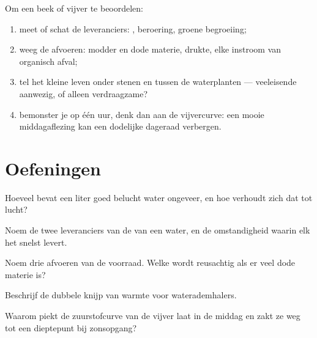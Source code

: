 \begin{method}\label{met:g7:oxygen-in-the-water:judge}
Om een beek of vijver te beoordelen:
\begin{enumerate}
  \item meet of schat de leveranciers: , beroering, groene
        begroeiing;
  \item weeg de afvoeren: modder en dode materie, drukte, elke instroom
        van organisch afval;
  \item tel het kleine leven onder stenen en tussen de waterplanten ---
        veeleisende  aanwezig, of alleen verdraagzame?
  \item bemonster je op één uur, denk dan aan de vijvercurve: een mooie
        middagaflezing kan een dodelijke dageraad verbergen.
\end{enumerate}
\end{method}

\section{Oefeningen}

\begin{exercise}[$\star$]\label{exo:g7:oxygen-in-the-water:1}
Hoeveel  bevat een liter goed belucht water ongeveer, en hoe
verhoudt zich dat tot lucht?
\end{exercise}

\begin{exercise}[$\star$]\label{exo:g7:oxygen-in-the-water:2}
Noem de twee leveranciers van de  van een water, en de
omstandigheid waarin elk het snelst levert.
\end{exercise}

\begin{exercise}[$\star$]\label{exo:g7:oxygen-in-the-water:3}
Noem drie afvoeren van de voorraad. Welke wordt reusachtig als er veel
dode materie is?
\end{exercise}

\begin{exercise}[$\star$]\label{exo:g7:oxygen-in-the-water:4}
Beschrijf de dubbele knijp van warmte voor waterademhalers.
\end{exercise}

\begin{exercise}[$\star$]\label{exo:g7:oxygen-in-the-water:5}
Waarom piekt de zuurstofcurve van de vijver laat in de middag en zakt ze
weg tot een dieptepunt bij zonsopgang?
\end{exercise}

